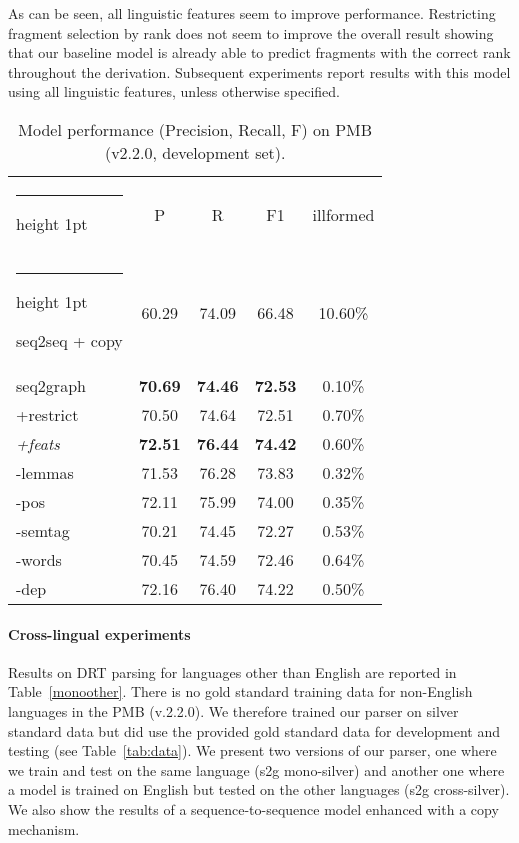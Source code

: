 \documentclass[11pt,a4paper]{article}
\makeatletter
\theoremstyle{plain}
\newcommand{\thickhline}{\noalign {\ifnum 0=`}\fi \hrule height 1pt
    \futurelet \reserved@a \@xhline
}
\makeatother
\begin{document}
As can be seen, all linguistic features seem to improve
performance. Restricting fragment selection by rank does not seem to improve the overall result showing that our baseline model is already able to predict fragments with the correct rank throughout the derivation. Subsequent experiments report results with this model using all linguistic features, unless otherwise specified.

\begin{table}[t]
\begin{center}
\begin{small}
\begin{tabular}{@{~}l@{~~~}c@{~~}c@{~~}c@{~~}c@{~~}} \thickhline
& P & R & F1 & illformed\\ 
\thickhline
seq2seq + copy & 60.29 & 74.09 & 66.48 & 10.60\%\\
\hline
seq2graph & \textbf{70.69} & \textbf{74.46} & \textbf{72.53} & 0.10\%\\
+restrict & 70.50 & 74.64 & 72.51 & 0.70\%\\
\hline
\textit{+feats} & \textbf{72.51} & \textbf{76.44} & \textbf{74.42} & 0.60\%\\
-lemmas & 71.53 & 76.28 & 73.83 & 0.32\%\\
-pos & 72.11 & 75.99 & 74.00 & 0.35\%\\
-semtag & 70.21 & 74.45 & 72.27 & 0.53\%\\
-words & 70.45 & 74.59 & 72.46 & 0.64\%\\
-dep & 72.16 & 76.40 & 74.22 & 0.50\%\\\hline
\end{tabular}
\end{small}
\caption{Model performance (Precision, Recall, F) on PMB
  (v2.2.0, development set).}
\label{Baseline}
\end{center}
\end{table}

\paragraph{Cross-lingual experiments} Results on DRT parsing
for languages other than English are reported in
Table~\ref{monoother}.  There is no gold standard training data for
non-English languages in the PMB (v.2.2.0). We therefore trained our
parser on silver standard data but did use the provided gold standard
data for development and testing (see Table~\ref{tab:data}).  We
present two versions of our parser, one where we train and test on the
same language (s2g mono-silver) and another one where a model is
trained on English but tested on the other languages (s2g
cross-silver). We also show the results of a sequence-to-sequence
model enhanced with a copy mechanism.
\end{document}
